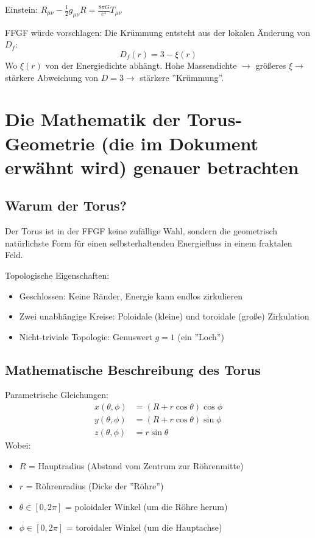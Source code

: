 	Einstein: \( R_{\mu\nu} - \frac{1}{2}g_{\mu\nu}R = \frac{8\pi G}{c^4} T_{\mu\nu} \)
	
	FFGF würde vorschlagen: Die Krümmung entsteht aus der lokalen Änderung von \( D_f \):
	\[
	D_f(r) = 3 - \xi(r)
	\]
	Wo \( \xi(r) \) von der Energiedichte abhängt. Hohe Massendichte \( \rightarrow \) größeres \( \xi \rightarrow \) stärkere Abweichung von \( D=3 \rightarrow \) stärkere ''Krümmung''.
	
	\section{Die Mathematik der Torus-Geometrie (die im Dokument erwähnt wird) genauer betrachten}
	\subsection{Warum der Torus?}
	Der Torus ist in der FFGF keine zufällige Wahl, sondern die geometrisch natürlichste Form für einen selbsterhaltenden Energiefluss in einem fraktalen Feld.
	
	Topologische Eigenschaften:
	\begin{itemize}
		\item Geschlossen: Keine Ränder, Energie kann endlos zirkulieren
		\item Zwei unabhängige Kreise: Poloidale (kleine) und toroidale (große) Zirkulation
		\item Nicht-triviale Topologie: Genuswert \( g = 1 \) (ein ''Loch'')
	\end{itemize}
	
	\subsection{Mathematische Beschreibung des Torus}
	Parametrische Gleichungen:
	\begin{align}
		x(\theta, \phi) &= (R + r \cos \theta) \cos \phi \\
		y(\theta, \phi) &= (R + r \cos \theta) \sin \phi \\
		z(\theta, \phi) &= r \sin \theta
	\end{align}
	Wobei:
	\begin{itemize}
		\item \( R \) = Hauptradius (Abstand vom Zentrum zur Röhrenmitte)
		\item \( r \) = Röhrenradius (Dicke der ''Röhre'')
		\item \( \theta \in [0, 2\pi] \) = poloidaler Winkel (um die Röhre herum)
		\item \( \phi \in [0, 2\pi] \) = toroidaler Winkel (um die Hauptachse)
	\end{itemize}
	
